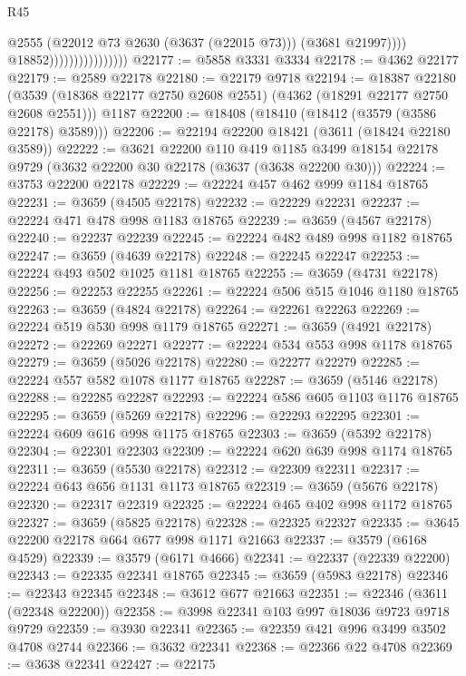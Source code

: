 \begin{lexlean}{R45}
\begin{coremodule}
                                          @2555
                                          (@22012 @73 @2630 (@3637 (@22015 @73)))
                                          (@3681 @21997))))
                                    @18852))))))))))))))))
@22177 := @5858 @3331 @3334
@22178 := @4362 @22177
@22179 := @2589 @22178
@22180 := @22179 @9718
@22194 := @18387
    @22180
    (@3539 (@18368 @22177 @2750 @2608 @2551) (@4362 (@18291 @22177 @2750 @2608 @2551)))
    @1187
@22200 := @18408 (@18410 (@18412 (@3579 (@3586 @22178) @3589)))
@22206 := @22194 @22200 @18421 (@3611 (@18424 @22180 @3589))
@22222 := @3621
    @22200
    @110
    @419
    @1185
    @3499
    @18154
    @22178
    @9729
    (@3632 @22200 @30 @22178 (@3637 (@3638 @22200 @30)))
@22224 := @3753 @22200 @22178
@22229 := @22224 @457 @462 @999 @1184 @18765
@22231 := @3659 (@4505 @22178)
@22232 := @22229 @22231
@22237 := @22224 @471 @478 @998 @1183 @18765
@22239 := @3659 (@4567 @22178)
@22240 := @22237 @22239
@22245 := @22224 @482 @489 @998 @1182 @18765
@22247 := @3659 (@4639 @22178)
@22248 := @22245 @22247
@22253 := @22224 @493 @502 @1025 @1181 @18765
@22255 := @3659 (@4731 @22178)
@22256 := @22253 @22255
@22261 := @22224 @506 @515 @1046 @1180 @18765
@22263 := @3659 (@4824 @22178)
@22264 := @22261 @22263
@22269 := @22224 @519 @530 @998 @1179 @18765
@22271 := @3659 (@4921 @22178)
@22272 := @22269 @22271
@22277 := @22224 @534 @553 @998 @1178 @18765
@22279 := @3659 (@5026 @22178)
@22280 := @22277 @22279
@22285 := @22224 @557 @582 @1078 @1177 @18765
@22287 := @3659 (@5146 @22178)
@22288 := @22285 @22287
@22293 := @22224 @586 @605 @1103 @1176 @18765
@22295 := @3659 (@5269 @22178)
@22296 := @22293 @22295
@22301 := @22224 @609 @616 @998 @1175 @18765
@22303 := @3659 (@5392 @22178)
@22304 := @22301 @22303
@22309 := @22224 @620 @639 @998 @1174 @18765
@22311 := @3659 (@5530 @22178)
@22312 := @22309 @22311
@22317 := @22224 @643 @656 @1131 @1173 @18765
@22319 := @3659 (@5676 @22178)
@22320 := @22317 @22319
@22325 := @22224 @465 @402 @998 @1172 @18765
@22327 := @3659 (@5825 @22178)
@22328 := @22325 @22327
@22335 := @3645 @22200 @22178 @664 @677 @998 @1171 @21663
@22337 := @3579 (@6168 @4529)
@22339 := @3579 (@6171 @4666)
@22341 := @22337 (@22339 @22200)
@22343 := @22335 @22341 @18765
@22345 := @3659 (@5983 @22178)
@22346 := @22343 @22345
@22348 := @3612 @677 @21663
@22351 := @22346 (@3611 (@22348 @22200))
@22358 := @3998 @22341 @103 @997 @18036 @9723 @9718 @9729
@22359 := @3930 @22341
@22365 := @22359 @421 @996 @3499 @3502 @4708 @2744
@22366 := @3632 @22341
@22368 := @22366 @22 @4708
@22369 := @3638 @22341
@22427 := @22175

\end{coremodule}
\end{lexlean}
